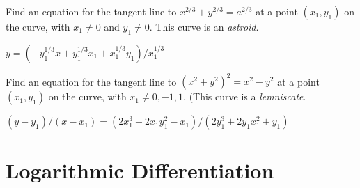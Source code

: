 \begin{exercises}
\begin{exercise} Find an equation for the tangent line to $x^{2/3} +
y^{2/3} = a^{2/3}$ at a point $(x_1 ,y_1)$ on the curve, 
with $x_1 \neq 0$ and $y_1 \neq 0$. This curve is an \textit{astroid}.
\begin{answer} $y=(-y_1^{1/3}x+y_1^{1/3}x_1+x_1^{1/3}y_1)/x_1^{1/3}$
\end{answer}\end{exercise}

\begin{exercise} Find an equation for the tangent line to $(x^2 +y^2 )^2 =x^2
-y^2$ at a point $(x_1 , y_1)$ on the curve, with $x_1 \neq 0, -1, 1$.
(This curve is a \textit{lemniscate}.
\begin{answer} $(y-y_1)/(x-x_1)=(2x_1^3+2x_1y_1^2-x_1)/(2y_1^3+2y_1x_1^2+y_1)$
\end{answer}\end{exercise}


\end{exercises}





















\section{Logarithmic Differentiation}


















